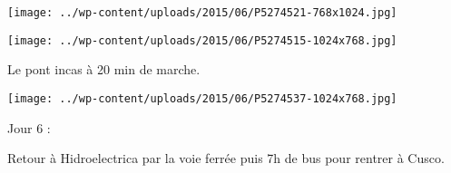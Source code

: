 \begin{center} \texttt{[image: ../wp-content/uploads/2015/06/P5274521-768x1024.jpg]} \end{center}

 

 

\begin{center} \texttt{[image: ../wp-content/uploads/2015/06/P5274515-1024x768.jpg]} \end{center}

 

 Le pont incas à 20 min de marche. 

 

\begin{center} \texttt{[image: ../wp-content/uploads/2015/06/P5274537-1024x768.jpg]} \end{center}

 

 Jour 6 : 

 Retour à Hidroelectrica par la voie ferrée puis 7h de bus pour rentrer à Cusco.


 
 
